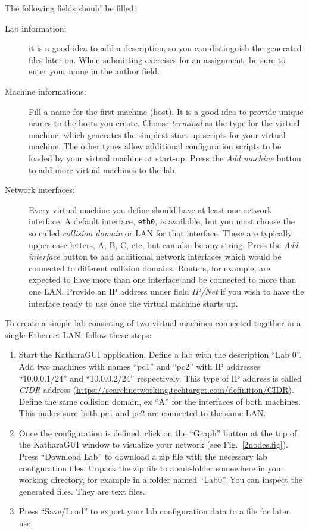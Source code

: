 \documentclass[12pt]{book}
\begin{document}
The following fields should be filled:
\begin{description}
\item[Lab information:] it is a good idea to add a description, so you
  can distinguish the generated files later on. When submitting
  exercises for an assignment, be sure to enter your name in the
  author field.
\item[Machine informations:] Fill a name for the first machine
  (host). It is a good idea to provide unique names to the hosts you
  create. Choose \emph{terminal} as the type for the virtual
  machine, which generates the simplest start-up scripts for your
  virtual machine. The other types allow additional configuration
  scripts to be loaded by your virtual machine at start-up. Press the
  \emph{Add machine} button to add more virtual machines to the lab. 
\item[Network interfaces:] Every virtual machine you define should
  have at least one network interface. A default interface,
  \verb$eth0$, is available, but you must choose the so called
  \emph{collision domain} or LAN for that interface. These are
  typically upper case letters, A, B, C, etc, but can also be any
  string. Press the \emph{Add interface} button to add additional
  network interfaces which would be connected to different collision
  domains. Routers, for example, are expected to have more than one
  interface and be connected to more than one LAN.  Provide an IP
  address under field \emph{IP/Net} if you wish to have the interface
  ready to use once the virtual machine starts up.
\end{description}

\smallskip
To create a simple lab consisting of two virtual machines connected together
in a single Ethernet LAN, follow these steps:

\begin{enumerate}[(1)]
\item Start the KatharaGUI application. Define a lab with the
  description ``Lab 0''. Add two machines with names ``pc1'' and
  ``pc2'' with IP addresses ``10.0.0.1/24'' and ``10.0.0.2/24''
  respectively. This type of IP address is called \emph{CIDR} address
  (\url{https://searchnetworking.techtarget.com/definition/CIDR}). 
  Define the same collision domain, ex ``A'' for the interfaces of
  both machines. This makes sure both pc1 and pc2 are connected to the
  same LAN. 

\item Once the configuration is defined, click on the ``Graph'' button
  at the top of the KatharaGUI window to visualize your network (see
  Fig.~\ref*{2nodes.fig}). Press
  ``Download Lab'' to download a zip file with the necessary lab
  configuration files. Unpack the zip file to a sub-folder somewhere
  in your working directory, for example in a folder named
  ``Lab0''. You can inspect the generated files. They are text files.

\item Press ``Save/Load'' to export your lab configuration data to a
  file for later use.
\end{enumerate}
\end{document}
